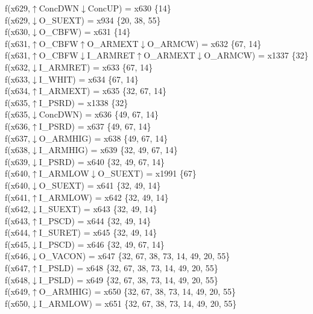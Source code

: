 f(x629,$\uparrow$ConcDWN$\downarrow$ConcUP) = x630 \{14\} \\  
f(x629,$\downarrow$O\_SUEXT) = x934 \{20, 38, 55\} \\  
f(x630,$\downarrow$O\_CBFW) = x631 \{14\} \\  
f(x631,$\uparrow$O\_CBFW$\uparrow$O\_ARMEXT$\downarrow$O\_ARMCW) = x632 \{67, 14\} \\  
f(x631,$\uparrow$O\_CBFW$\downarrow$I\_ARMRET$\uparrow$O\_ARMEXT$\downarrow$O\_ARMCW) = x1337 \{32\} \\  
f(x632,$\downarrow$I\_ARMRET) = x633 \{67, 14\} \\  
f(x633,$\downarrow$I\_WHIT) = x634 \{67, 14\} \\  
f(x634,$\uparrow$I\_ARMEXT) = x635 \{32, 67, 14\} \\  
f(x635,$\uparrow$I\_PSRD) = x1338 \{32\} \\  
f(x635,$\downarrow$ConcDWN) = x636 \{49, 67, 14\} \\  
f(x636,$\uparrow$I\_PSRD) = x637 \{49, 67, 14\} \\  
f(x637,$\downarrow$O\_ARMHIG) = x638 \{49, 67, 14\} \\  
f(x638,$\downarrow$I\_ARMHIG) = x639 \{32, 49, 67, 14\} \\  
f(x639,$\downarrow$I\_PSRD) = x640 \{32, 49, 67, 14\} \\  
f(x640,$\uparrow$I\_ARMLOW$\downarrow$O\_SUEXT) = x1991 \{67\} \\  
f(x640,$\downarrow$O\_SUEXT) = x641 \{32, 49, 14\} \\  
f(x641,$\uparrow$I\_ARMLOW) = x642 \{32, 49, 14\} \\  
f(x642,$\downarrow$I\_SUEXT) = x643 \{32, 49, 14\} \\  
f(x643,$\uparrow$I\_PSCD) = x644 \{32, 49, 14\} \\  
f(x644,$\uparrow$I\_SURET) = x645 \{32, 49, 14\} \\  
f(x645,$\downarrow$I\_PSCD) = x646 \{32, 49, 67, 14\} \\  
f(x646,$\downarrow$O\_VACON) = x647 \{32, 67, 38, 73, 14, 49, 20, 55\} \\  
f(x647,$\uparrow$I\_PSLD) = x648 \{32, 67, 38, 73, 14, 49, 20, 55\} \\  
f(x648,$\downarrow$I\_PSLD) = x649 \{32, 67, 38, 73, 14, 49, 20, 55\} \\  
f(x649,$\uparrow$O\_ARMHIG) = x650 \{32, 67, 38, 73, 14, 49, 20, 55\} \\  
f(x650,$\downarrow$I\_ARMLOW) = x651 \{32, 67, 38, 73, 14, 49, 20, 55\} \\  
